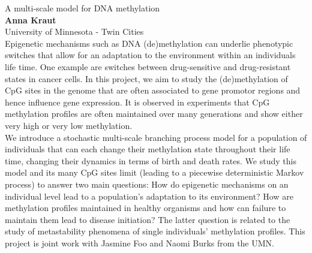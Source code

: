 \documentclass[12pt,a4paper]{article}
\begin{document}
\bigskip \bigskip  %

\noindent
{\Large A multi-scale model for DNA methylation}\\[1ex]
{\large 
\textbf{Anna Kraut}\\[1ex] University of Minnesota - Twin Cities}\\[2ex]
Epigenetic mechanisms such as DNA (de)methylation can underlie phenotypic switches that allow for an adaptation to the environment within an individuals life time. One example are switches between drug-sensitive and drug-resistant states in cancer cells. In this project, we aim to study the (de)methylation of CpG sites in the genome that are often associated to gene promotor regions and hence influence gene expression. It is observed in experiments that CpG methylation profiles are often maintained over many generations and show either very high or very low methylation.
\\
We introduce a stochastic multi-scale branching process model for a population of individuals that can each change their methylation state throughout their life time, changing their dynamics in terms of birth and death rates. We study this model and its many CpG sites limit (leading to a piecewise deterministic Markov process) to answer two main questions: How do epigenetic mechanisms on an individual level lead to a population's adaptation to its environment? How are methylation profiles maintained in healthy organisms and how can failure to maintain them lead to disease initiation? The latter question is related to the study of metastability phenomena of single individuals' methylation profiles.
This project is joint work with Jasmine Foo and Naomi Burks from the UMN.

\bigskip \bigskip  %
\end{document}
